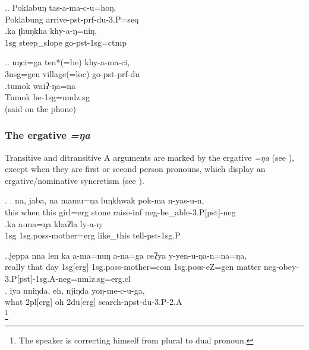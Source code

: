 	
 	\ex.\ag. Poklabuŋ tas-a-ma-c-u=hoŋ, \\
	Poklabung{\sc [loc]} arrive{\sc -pst-prf-du-3.P=seq} 	\\
	 	
\bg.ka  ʈhuŋkha           khy-a-ŋ=niŋ,\\
{\sc 1sg} steep\_slope{\sc [loc]} go{\sc -pst-1sg=ctmp}\\

	\ex.\ag. uŋci=ga    ten*(=be)        khy-a-ma-ci,\\
	{\sc 3nsg=gen} village{\sc *(=loc)}  go{\sc -pst-prf-du}		\\
	 	
	\bg.tumok waiʔ-ŋa=na\\
Tumok{\sc [loc]} be{\sc [npst]-1sg=nmlz.sg}\\
 (said on the phone)	
		
\subsubsection{The ergative \emph{=ŋa}}\label{case-erg}

Transitive and ditransitive A arguments are marked by the ergative \emph{=ŋa} (see \Next), except when they are first or second person pronouns, which display an ergative/nominative syncretism (see \NNext). 

	\ex. \ag. na,   jaba,   na   mamu=ŋa   luŋkhwak pok-ma        n-yas-u-n, \\
	this when this girl{\sc =erg} stone raise{\sc -inf}  {\sc neg-}be\_able{\sc -3.P[pst]-neg}\\
	\bg.ka  a-ma=ŋa                khaʔla   ly-a-ŋ: \\
	{\sc  1sg} {\sc 1sg.poss-}mother{\sc =erg} like\_this tell{\sc [3sg.A]-pst-1sg.P}\\

	
	\ex.\ag.jeppa nna  len ka       a-ma=nuŋ                a-na=ga     ceʔya y-yen-u-ŋa-n=na=ŋa, \\
	really that day {\sc 1sg[erg]} {\sc 1sg.poss-}mother{\sc =com} {\sc 1sg.poss-}eZ{\sc =gen} matter {\sc neg-}obey{\sc -3.P[pst]-1sg.A-neg=nmlz.sg=erg.cl}\\ 
\bg. iya nniŋda, eh,    njiŋda  yoŋ-me-c-u-ga,\\
what {\sc 2pl[erg]} oh {\sc 2du[erg]} search{\sc -npst-du-3.P-2.A}\\
\footnote{The speaker is correcting himself from plural to dual pronoun.} 
	
